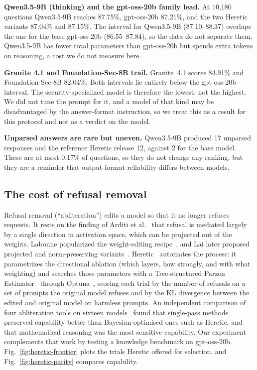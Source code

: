 \documentclass[conference]{IEEEtran}
\begin{document}
\textbf{Qwen3.5-9B (thinking) and the gpt-oss-20b family lead.} At 10{,}180
questions Qwen3.5-9B reaches 87.75\%, gpt-oss-20b 87.21\%, and the two
Heretic variants 87.04\% and 87.15\%. The interval for Qwen3.5-9B
(87.10--88.37) overlaps the one for the base gpt-oss-20b (86.55--87.84), so
the data do not separate them. Qwen3.5-9B has fewer total parameters than
gpt-oss-20b but spends extra tokens on reasoning, a cost we do not measure
here.

\textbf{Granite 4.1 and Foundation-Sec-8B trail.} Granite~4.1 scores 84.91\%
and Foundation-Sec-8B 82.04\%. Both intervals lie entirely below the
gpt-oss-20b interval. The security-specialized model is therefore the
lowest, not the highest. We did not tune the prompt for it, and a model of
that kind may be disadvantaged by the answer-format instruction, so we
treat this as a result for this protocol and not as a verdict on the model.

\textbf{Unparsed answers are rare but uneven.} Qwen3.5-9B produced 17
unparsed responses and the reference Heretic release 12, against 2 for
the base model. These are at most 0.17\% of questions, so they do not
change any ranking, but they are a reminder that output-format reliability
differs between models.

\subsection{The cost of refusal removal}
\label{sec:refusal}

Refusal removal (``abliteration'') edits a model so that it no longer
refuses requests. It rests on the finding of Arditi et
al.~\cite{arditi2024} that refusal is mediated largely by a single direction
in activation space, which can be projected out of the weights. Labonne
popularized the weight-editing recipe~\cite{labonne2024}, and Lai later
proposed projected and norm-preserving variants~\cite{lai2025}. Heretic~\cite{heretic}
automates the process: it parametrizes the directional ablation (which
layers, how strongly, and with what weighting) and searches those parameters
with a Tree-structured Parzen Estimator~\cite{bergstra2011} through
Optuna~\cite{optuna}, scoring each trial by
the number of refusals on a set of prompts the original model refuses and by
the KL divergence between the edited and original model on harmless prompts.
An independent comparison of four abliteration tools on sixteen
models~\cite{young2025} found that single-pass methods preserved capability
better than Bayesian-optimised ones such as Heretic, and that mathematical
reasoning was the most sensitive capability. Our experiment complements that
work by testing a knowledge benchmark on gpt-oss-20b.
Fig.~\ref{fig:heretic-frontier} plots the trials Heretic offered for
selection, and Fig.~\ref{fig:heretic-parity} compares capability.
\end{document}
